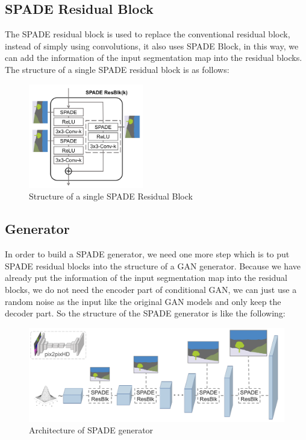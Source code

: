 \subsection{SPADE Residual Block}
The SPADE residual block is used to replace the conventional residual block, instead of simply 
using convolutions, it also uses SPADE Block, in this way, we can add the information of the 
input segmentation map into the residual blocks. The structure of a single SPADE residual 
block is as follows:
\begin{figure}[H]
    \begin{center}
    \includegraphics[width=5cm]{figures/SPADE-ResBlock}
    \end{center}
    \caption{Structure of a single SPADE Residual Block}
    \label{fig:SPADE-ResBlock}
\end{figure}

\subsection{Generator}
In order to build a SPADE generator, we need one more step which is to put SPADE residual blocks 
into the structure of a GAN generator. Because we have already put the information of the input 
segmentation map into the residual blocks, we do not need the encoder part of conditional GAN, 
we can just use a random noise as the input like the original GAN models and only keep the 
decoder part. So the structure of the SPADE generator is like the following:
\begin{figure}[H]
    \begin{center}
    \includegraphics[width=12cm]{figures/SPADE-generator}
    \end{center}
    \caption{Architecture of SPADE generator}
    \label{fig:SPADE-generator}
\end{figure}

